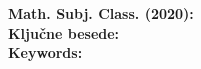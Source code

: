 \noindent
\textbf{Math. Subj. Class. (2020):} \@klasifikacija \\[1mm]
\def\sep{, } %
\textbf{Ključne besede:} \@kljucnebesede \\[1mm]
\textbf{Keywords:} \@keywords
